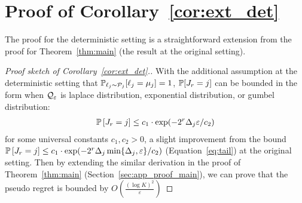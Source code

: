 \section{Proof of Corollary~\ref{cor:ext_det}}
\label{sec:app_ext_det}
The proof for the deterministic setting is a straightforward extension from the proof for Theorem~\ref{thm:main} (the result at the original setting).
\begin{proof}[Proof sketch of Corollary~\ref{cor:ext_det}.]
	With the additional assumption at the deterministic setting that $\mathbb{P}_{\ell_j\sim\mathcal{P}_j}[\ell_j=\mu_j]=1$, $\mathbb{P}[J_r=j]$ can be bounded in the form when $\mathcal{Q}_\varepsilon$ is laplace distribution, exponential distribution, or gumbel distribution:
	\begin{align}
	\label{eq:tail_det}
	\mathbb{P}\left[J_r = j\right]\leq c_1\cdot \exp(-2^r\Delta_j \varepsilon / c_2)
	\end{align}
	for some universal constants $c_1, c_2>0$, a slight improvement from the bound $\mathbb{P}\left[J_r = j\right]\leq c_1\cdot \exp(-2^r\Delta_j \min\{\Delta_j, \varepsilon\} / c_2)$ (Equation~\ref{eq:tail}) at the original setting.
	Then by extending the similar derivation in the proof of Theorem~\ref{thm:main} (Section~\ref{sec:app_proof_main}), we can prove that the pseudo regret is bounded by $O\left(\frac{(\log K)^2}{\varepsilon}\right)$
	
\end{proof}
